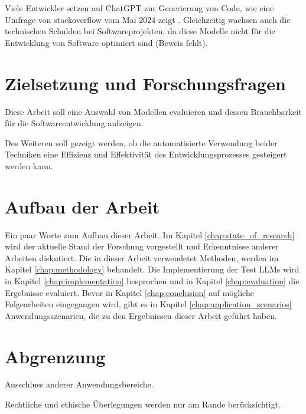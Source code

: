 Viele Entwickler setzen auf ChatGPT zur Generierung von Code, wie eine Umfrage von stackoverflow vom Mai 2024 zeigt \cite{noauthor_developers_2024}. Gleichzeitig wachsen auch die technischen Schulden bei Softwareprojekten, da diese Modelle nicht für die Entwicklung von Software optimiert sind (Beweis fehlt).\vspace{0.2cm}


\section{Zielsetzung und Forschungsfragen}
Diese Arbeit soll eine Auswahl von Modellen evaluieren und dessen Brauchbarkeit für die Softwareentwicklung aufzeigen.\vspace{0.2cm}

Des Weiteren soll gezeigt werden, ob die automatisierte Verwendung beider Techniken eine Effizienz und Effektivität des Entwicklungsprozesses gesteigert werden kann.


\section{Aufbau der Arbeit}
Ein paar Worte zum Aufbau dieser Arbeit. Im Kapitel \ref{chap:state_of_research} wird der aktuelle Stand der Forschung vorgestellt und Erkenntnisse anderer Arbeiten diskutiert. Die in dieser Arbeit verwendetet Methoden, werden im Kapitel \ref{chap:methodology} behandelt. Die Implementierung der Test LLMs wird in Kapitel \ref{chap:implementation} besprochen und in Kapitel \ref{chap:evaluation} die Ergebnisse evaluiert. Bevor in Kapitel \ref{chap:conclusion} auf mögliche Folgearbeiten eingegangen wird, gibt es in Kapitel \ref{chap:application_scenarios} Anwendungsszenarien, die zu den Ergebnissen dieser Arbeit geführt haben.


\section{Abgrenzung}
Ausschluss anderer Anwendungsbereiche.

Rechtliche und ethische Überlegungen werden nur am Rande berücksichtigt.